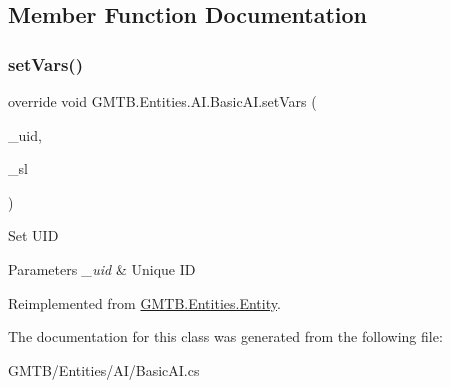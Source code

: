 \subsection{Member Function Documentation}
\mbox{\label{class_g_m_t_b_1_1_entities_1_1_a_i_1_1_basic_a_i_a848c08ffa4f9f575c970308a65144f52}} 
\subsubsection{\texorpdfstring{setVars()}{setVars()}}
{\footnotesize\ttfamily override void G\+M\+T\+B.\+Entities.\+A\+I.\+Basic\+A\+I.\+set\+Vars (\begin{DoxyParamCaption}\item[{int}]{\+\_\+uid,  }\item[{\mbox{\hyperlink{interface_g_m_t_b_1_1_interfaces_1_1_i_service_locator}{I\+Service\+Locator}}}]{\+\_\+sl }\end{DoxyParamCaption})\hspace{0.3cm}{\ttfamily [virtual]}}



Set U\+ID 


\begin{DoxyParams}{Parameters}
{\em \+\_\+uid} & Unique ID \\
\hline
\end{DoxyParams}


Reimplemented from \mbox{\hyperlink{class_g_m_t_b_1_1_entities_1_1_entity_ae6d69c22b16436ec6df3b79099e1e81b}{G\+M\+T\+B.\+Entities.\+Entity}}.



The documentation for this class was generated from the following file\+:\begin{DoxyCompactItemize}
\item 
G\+M\+T\+B/\+Entities/\+A\+I/Basic\+A\+I.\+cs\end{DoxyCompactItemize}
